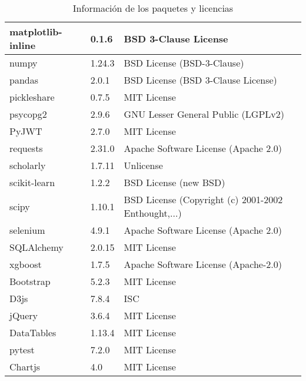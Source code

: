 \begin{table}[h]
\begin{tabular}{|l|l|l|}
matplotlib-inline & 0.1.6 & BSD 3-Clause License \\ \hline
numpy & 1.24.3 &  BSD License (BSD-3-Clause) \\ \hline
pandas & 2.0.1 &  BSD License (BSD 3-Clause License) \\ \hline
pickleshare & 0.7.5 &  MIT License \\ \hline
psycopg2 & 2.9.6 &  GNU Lesser General Public (LGPLv2) \\ \hline
PyJWT & 2.7.0 &  MIT License \\ \hline
requests & 2.31.0 &  Apache Software License (Apache 2.0) \\ \hline
scholarly & 1.7.11 &  Unlicense \\ \hline
scikit-learn & 1.2.2 & BSD License (new BSD) \\ \hline
scipy & 1.10.1 &  BSD License (Copyright (c) 2001-2002 Enthought,...) \\ \hline
selenium & 4.9.1 &  Apache Software License (Apache 2.0) \\ \hline
SQLAlchemy & 2.0.15 &  MIT License \\ \hline
xgboost & 1.7.5 &  Apache Software License (Apache-2.0) \\ \hline
Bootstrap & 5.2.3 &  MIT License \\ \hline
D3js & 7.8.4 &  ISC \\ \hline
jQuery & 3.6.4 &  MIT License \\ \hline
DataTables & 1.13.4 &  MIT License \\ \hline
pytest & 7.2.0 &  MIT License \\ \hline
Chartjs & 4.0 & MIT License \\ \hline
\end{tabular}
\caption{Información de los paquetes y licencias}
\label{tab:paquetes-licencias}
\end{table}


